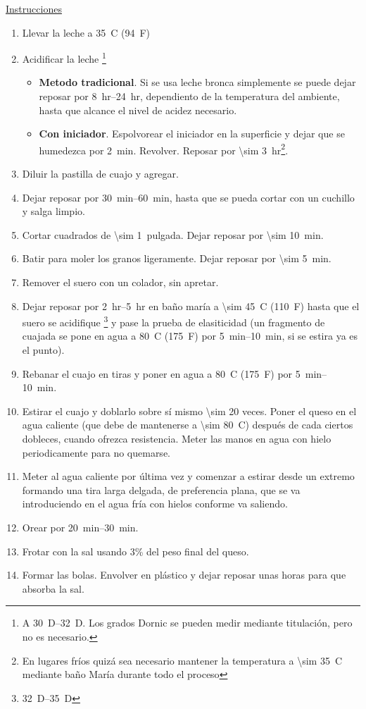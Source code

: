 \underline{Instrucciones}
\begin{enumerate}
\item Llevar la leche a \SI{35}{C} (\SI{94}{F})
\item Acidificar la leche \footnote{A \SIrange{30}{32}{D}. Los grados Dornic se pueden medir mediante titulación, pero no es necesario.} 
\begin{itemize}
\item \textbf{Metodo tradicional}. Si se usa leche bronca simplemente se puede dejar reposar por \SIrange{8}{24}{hr}, dependiento de la temperatura del ambiente, hasta que alcance el nivel de acidez necesario.
\item \textbf{Con iniciador}. Espolvorear el iniciador en la superficie y dejar que se humedezca por \SI{2}{min}. Revolver. Reposar por \SI{\sim 3}{hr}\footnote{En lugares fríos quizá sea necesario mantener la temperatura a \SI{\sim 35}{C} mediante baño María durante todo el proceso}.
\end{itemize}
\item Diluir la pastilla de cuajo y agregar.
\item Dejar reposar por \SIrange{30}{60}{min}, hasta que se pueda cortar con un cuchillo y salga limpio.
\item Cortar cuadrados de \SI{\sim 1}{pulgada}. Dejar reposar por \SI{\sim 10}{min}.
\item Batir para moler los granos ligeramente. Dejar reposar por \SI{\sim 5}{min}.
\item Remover el suero con un colador, sin apretar.
\item Dejar reposar por \SIrange{2}{5}{hr} en baño maría a \SI{\sim 45}{C} (\SI{110}{F}) hasta que el suero se acidifique \footnote{\SIrange{32}{35}{D}} y pase la prueba de elasiticidad (un fragmento de cuajada se pone en agua a \SI{80}{C} (\SI{175}{F}) por \SIrange{5}{10}{min}, si se estira ya es el punto).
\item Rebanar el cuajo en tiras y poner en agua a \SI{80}{C} (\SI{175}{F}) por  \SIrange{5}{10}{min}.
\item Estirar el cuajo y doblarlo sobre sí mismo \num{\sim 20} veces. Poner el queso en el agua caliente (que debe de mantenerse a \SI{\sim 80}{C}) después de cada ciertos dobleces, cuando ofrezca resistencia. Meter las manos en agua con hielo periodicamente para no quemarse.
\item Meter al agua caliente por última vez y comenzar a estirar desde un extremo formando una tira larga delgada, de preferencia plana, que se va introduciendo en el agua fría con hielos conforme va saliendo. 
\item Orear por \SIrange{20}{30}{min}.
\item Frotar con la sal usando 3\% del peso final del queso.
\item Formar las bolas. Envolver en plástico y dejar reposar unas horas para que absorba la sal.
\end{enumerate}
